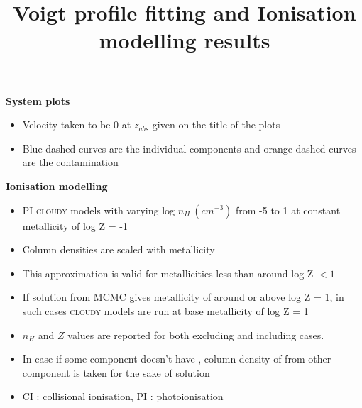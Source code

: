 \documentclass[12pt,draft]{report}
\title{\textbf{Voigt profile fitting and Ionisation modelling results}}
\newcommand\ion[2]{\text{#1\,\textsc{\lowercase{#2}}}}
\begin{document}
\maketitle

\textbf{System plots} 

\begin{itemize}
    \item Velocity taken to be 0 at $z_{abs}$ given on the title of the plots
    \item Blue dashed curves are the individual components and orange dashed curves are the contamination
\end{itemize}

\textbf{Ionisation modelling} 

\begin{itemize}
    \item PI \textsc{cloudy} models with varying log $n_H \ (cm^{-3})$ from -5 to 1 at constant metallicity of log Z = -1
    \item Column densities are scaled with metallicity
    \item This approximation is valid for metallicities less than around log Z $<1$
    \item If solution from MCMC gives metallicity of around or above log Z = 1, in such cases \textsc{cloudy} models are run at base metallicity of log Z = 1 
    \item $n_H$ and $Z$ values are reported for both excluding and including \ion{O}{vi} cases.
    \item In case if some component doesn't have \ion{O}{vi}, column density of \ion{O}{vi} from other component is taken for the sake of solution
    \item CI : collisional ionisation,  PI : photoionisation
\end{itemize}


\newpage
\end{document}
